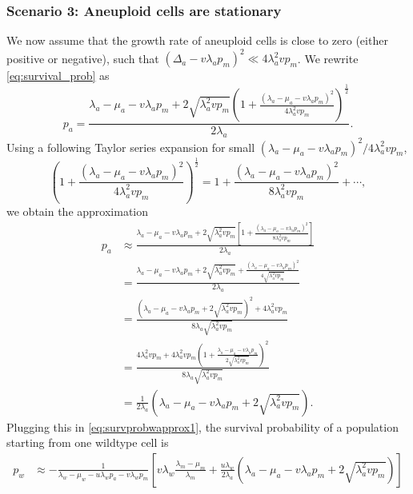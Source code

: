 \documentclass[12pt]{extarticle}
\begin{document}
\begin{appendices}
\subsubsection*{Scenario 3: Aneuploid cells are stationary} 
We now assume that the growth rate of aneuploid cells is close to zero (either positive or negative), such that  $\left(\Delta_a-v\lambda_ap_m\right)^2 \ll 4\lambda_a^2vp_m$.
We rewrite \cref{eq:survival_prob} as
\begin{equation}
p_a = \frac{\lambda_a-\mu_a-v\lambda_ap_m+2\sqrt{\lambda_a^2 vp_m}\left(1+\frac{\left(\lambda_a-\mu_a-v\lambda_ap_m\right)^2}{4\lambda_a^2vp_m}\right)^{\frac12}}{2\lambda_a} .
\end{equation}
Using a following Taylor series expansion for small $\left(\lambda_a-\mu_a-v\lambda_ap_m\right)^2 / 4\lambda_a^2vp_m$,
\begin{equation*}
\left(1+\frac{\left(\lambda_a-\mu_a-v\lambda_ap_m\right)^2}{4\lambda_a^2vp_m}\right)^{\frac{1}{2}}=1+\frac{\left(\lambda_a-\mu_a-v\lambda_ap_m\right)^2}{8\lambda_a^2vp_m}+\cdots,
\end{equation*}
we obtain the approximation
\begin{equation}
\begin{aligned}
p_a&\approx\frac{\lambda_a-\mu_a-v\lambda_ap_m+2\sqrt{\lambda_a^2 vp_m}\left[1+\frac{\left(\lambda_a-\mu_a-v\lambda_ap_m\right)^2}{8\lambda_a^2vp_m}\right]}{2\lambda_a}\\
&=\frac{\lambda_a-\mu_a-v\lambda_ap_m+2\sqrt{\lambda_a^2 vp_m}+\frac{\left(\lambda_a-\mu_a-v\lambda_ap_m\right)^2}{4\sqrt{\lambda_a^2vp_m}}}{2\lambda_a}\\
&=\frac{\left(\lambda_a-\mu_a-v\lambda_ap_m+2\sqrt{\lambda_a^2vp_m}\right)^2+4\lambda_a^2vp_m}{8\lambda_a\sqrt{\lambda_a^2vp_m}}\\
&=\frac{4\lambda_a^2vp_m+4\lambda_a^2vp_m\left(1+\frac{\lambda_a-\mu_a-v\lambda_ap_m}{2\sqrt{\lambda_a^2vp_m}}\right)^2}{8\lambda_a\sqrt{\lambda_a^2vp_m}}\\
&=\frac{1}{2\lambda_a}\left(\lambda_a-\mu_a-v\lambda_ap_m+2\sqrt{\lambda_a^2vp_m}\right).
\end{aligned}
\end{equation}
Plugging this in \cref{eq:survprobwapprox1}, the survival probability of a population starting from one wildtype cell is
\begin{equation}\label{eq:scenario3}
\begin{aligned}
p_w&\approx-\frac{1}{\lambda_w-\mu_w-u\lambda_wp_a-v\lambda_wp_m}\left[v\lambda_w\frac{\lambda_m-\mu_m}{\lambda_m}+\frac{u\lambda_w}{2\lambda_a}\left(\lambda_a-\mu_a-v\lambda_ap_m+2\sqrt{\lambda_a^2vp_m}\right)\right]\\

\end{aligned}
\end{equation}
\end{appendices}
\end{document}
